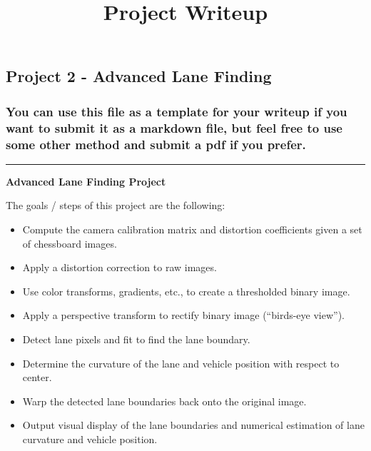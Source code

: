\documentclass[11pt]{article}
\title{Project Writeup}
\providecommand{\tightlist}{%
      \setlength{\itemsep}{0pt}\setlength{\parskip}{0pt}}
\begin{document}
    
    
    \maketitle
    
    

    
    \hypertarget{project-2---advanced-lane-finding}{%
\subsection{Project 2 - Advanced Lane
Finding}\label{project-2---advanced-lane-finding}}

\hypertarget{you-can-use-this-file-as-a-template-for-your-writeup-if-you-want-to-submit-it-as-a-markdown-file-but-feel-free-to-use-some-other-method-and-submit-a-pdf-if-you-prefer.}{%
\subsubsection{You can use this file as a template for your writeup if
you want to submit it as a markdown file, but feel free to use some
other method and submit a pdf if you
prefer.}\label{you-can-use-this-file-as-a-template-for-your-writeup-if-you-want-to-submit-it-as-a-markdown-file-but-feel-free-to-use-some-other-method-and-submit-a-pdf-if-you-prefer.}}

\begin{center}\rule{0.5\linewidth}{\linethickness}\end{center}

\textbf{Advanced Lane Finding Project}

The goals / steps of this project are the following:

\begin{itemize}
\tightlist
\item
  Compute the camera calibration matrix and distortion coefficients
  given a set of chessboard images.
\item
  Apply a distortion correction to raw images.
\item
  Use color transforms, gradients, etc., to create a thresholded binary
  image.
\item
  Apply a perspective transform to rectify binary image (``birds-eye
  view'').
\item
  Detect lane pixels and fit to find the lane boundary.
\item
  Determine the curvature of the lane and vehicle position with respect
  to center.
\item
  Warp the detected lane boundaries back onto the original image.
\item
  Output visual display of the lane boundaries and numerical estimation
  of lane curvature and vehicle position.
\end{itemize}
\end{document}
